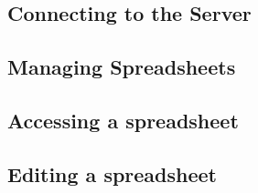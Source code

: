 \subsection{Connecting to the Server}
\label{sec:connecting}


\subsection{Managing Spreadsheets}
\label{sec:managing}


\subsection{Accessing a spreadsheet}
\label{sec:accessing}


\subsection{Editing a spreadsheet}
\label{sec:editing}

